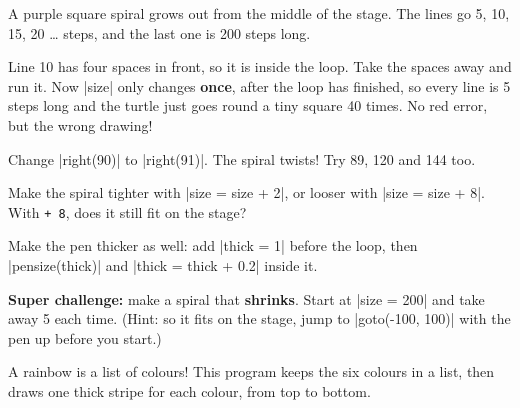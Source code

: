 A purple square spiral grows out from the middle of the stage. The lines go 5, 10, 15, 20 \ldots{} steps, and the last one is 200 steps long.

\begin{think}
Line 10 has four spaces in front, so it is inside the loop. Take the spaces away and run it. Now \py|size| only changes \textbf{once}, after the loop has finished, so every line is 5 steps long and the turtle just goes round a tiny square 40 times. No red error, but the wrong drawing!
\end{think}

\begin{challenge}
\tick Change \py|right(90)| to \py|right(91)|. The spiral twists! Try 89, 120 and 144 too.\par
\tick Make the spiral tighter with \py|size = size + 2|, or looser with \py|size = size + 8|. With \texttt{+ 8}, does it still fit on the stage?\par
\tick Make the pen thicker as well: add \py|thick = 1| before the loop, then \py|pensize(thick)| and \py|thick = thick + 0.2| inside it.\par
\tick \textbf{Super challenge:} make a spiral that \textbf{shrinks}. Start at \py|size = 200| and take away 5 each time. (Hint: so it fits on the stage, jump to \py|goto(-100, 100)| with the pen up before you start.)
\end{challenge}


A rainbow is a list of colours! This program keeps the six colours in a list, then draws one thick stripe for each colour, from top to bottom.

